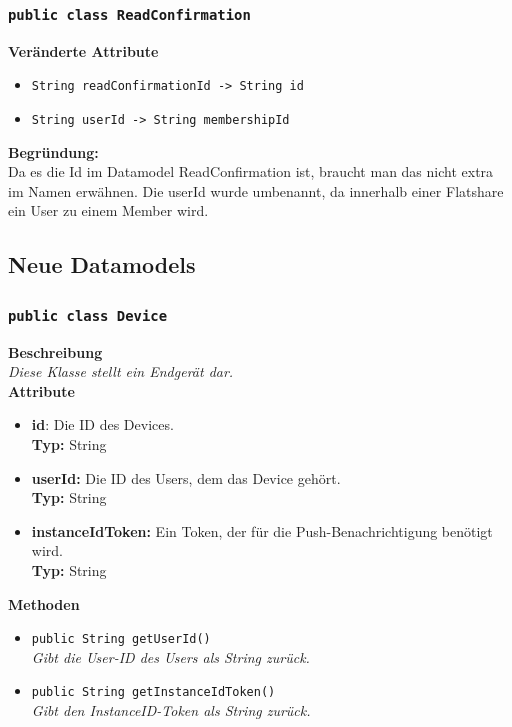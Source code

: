 \documentclass[a4paper]{scrreprt}
\begin{document}
	\subsubsection{\texttt{public class ReadConfirmation}}
	\textbf{Veränderte Attribute}
	\begin{itemize}
		\item \texttt{String readConfirmationId -> String id}
		\item \texttt{String userId -> String membershipId}
	\end{itemize}
	\textbf{Begründung:}\\
	Da es die Id im Datamodel ReadConfirmation ist, braucht man das nicht extra im Namen erwähnen. Die userId wurde umbenannt, da innerhalb einer Flatshare ein User zu einem Member wird.
	\subsection{Neue Datamodels}
	\subsubsection{\texttt{public class Device}}
	\textbf{Beschreibung} \\
	\textit{Diese Klasse stellt ein Endgerät dar.} \\
	
	\textbf{Attribute}
	\begin{itemize}
		\item \textbf{id}: Die ID des Devices. \\
		\textbf{Typ:} String
		
		\item \textbf{userId:} Die ID des Users, dem das Device gehört. \\
		\textbf{Typ:} String
		
		\item \textbf{instanceIdToken:} Ein Token, der für die Push-Benachrichtigung benötigt wird.\\
		\textbf{Typ:} String
	\end{itemize}
	
	\textbf{Methoden}
	\begin{itemize}
		\item{\texttt{public String getUserId()}}\\
		\textit{Gibt die User-ID des Users als String zurück.}\\
		\item{\texttt{public String getInstanceIdToken()}}\\
		\textit{Gibt den InstanceID-Token als String zurück.}\\
	\end{itemize}
\end{document}

